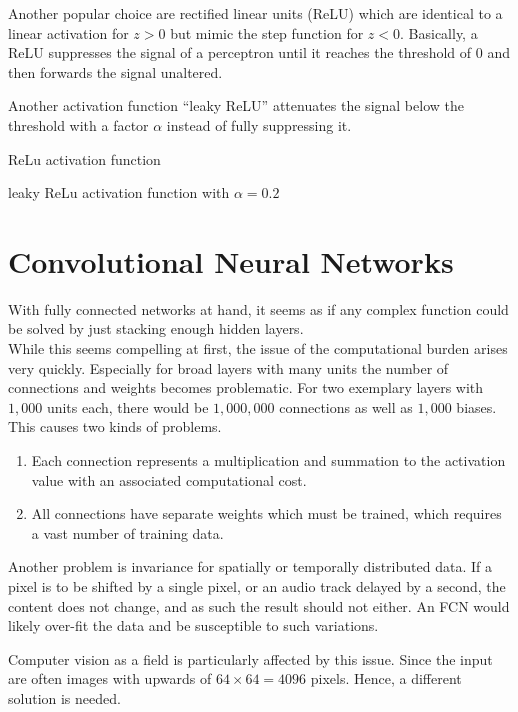 Another popular choice are rectified linear units (ReLU) which are identical to a linear activation for $z > 0$ but mimic the step function for $z < 0$.
Basically, a ReLU suppresses the signal of a perceptron until it reaches the threshold of $0$ and then forwards the signal unaltered.

Another activation function ``leaky ReLU'' attenuates the signal below the threshold with a factor $\alpha$ instead of fully suppressing it.
\begin{marginfigure}
    \resizebox{\textwidth}{!}{
        
    }
    \caption[]{ReLu activation function}
\end{marginfigure}
\begin{marginfigure}
    \resizebox{\textwidth}{!}{
        
    }
    \caption[]{leaky ReLu activation function with $\alpha = 0.2$}
\end{marginfigure}

\section{Convolutional Neural Networks}
With fully connected networks at hand, it seems as if any complex function could be solved by just stacking enough hidden layers.\\
While this seems compelling at first, the issue of the computational burden arises very quickly.
Especially for broad layers with many units the number of connections and weights becomes problematic.
For two exemplary layers with $1,000$ units each, there would be $1,000,000$ connections as well as $1,000$ biases.
This causes two kinds of problems.
\begin{enumerate}
    \item Each connection represents a multiplication and summation to the activation value with an associated computational cost.
    \item All connections have separate weights which must be trained, which requires a vast number of training data.
\end{enumerate}

Another problem is invariance for spatially or temporally distributed data.
If a pixel is to be shifted by a single pixel, or an audio track delayed by a second, the content does not change, and as such the result should not either.
An FCN would likely over-fit the data and be susceptible to such variations.

Computer vision as a field is particularly affected by this issue.
Since the input are often images with upwards of $64 \times 64 = 4096$ pixels.
Hence, a different solution is needed.

